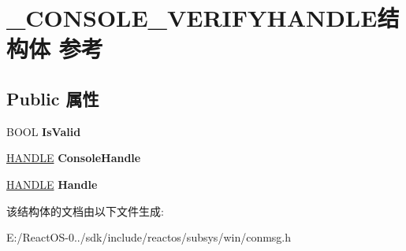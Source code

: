 \hypertarget{struct___c_o_n_s_o_l_e___v_e_r_i_f_y_h_a_n_d_l_e}{}\section{\+\_\+\+C\+O\+N\+S\+O\+L\+E\+\_\+\+V\+E\+R\+I\+F\+Y\+H\+A\+N\+D\+L\+E结构体 参考}
\label{struct___c_o_n_s_o_l_e___v_e_r_i_f_y_h_a_n_d_l_e}
\subsection*{Public 属性}
\begin{DoxyCompactItemize}
\item 
\mbox{\label{struct___c_o_n_s_o_l_e___v_e_r_i_f_y_h_a_n_d_l_e_ae8c7d2c859a28a715138dc9ee75b3db0}} 
B\+O\+OL {\bfseries Is\+Valid}
\item 
\mbox{\label{struct___c_o_n_s_o_l_e___v_e_r_i_f_y_h_a_n_d_l_e_aec8332e8b1441b6d6d17de7221ea6b67}} 
\hyperlink{interfacevoid}{H\+A\+N\+D\+LE} {\bfseries Console\+Handle}
\item 
\mbox{\label{struct___c_o_n_s_o_l_e___v_e_r_i_f_y_h_a_n_d_l_e_a787db4f617a2eade4d75ce83198cd625}} 
\hyperlink{interfacevoid}{H\+A\+N\+D\+LE} {\bfseries Handle}
\end{DoxyCompactItemize}


该结构体的文档由以下文件生成\+:\begin{DoxyCompactItemize}
\item 
E\+:/\+React\+O\+S-\/0../sdk/include/reactos/subsys/win/conmsg.\+h\end{DoxyCompactItemize}
